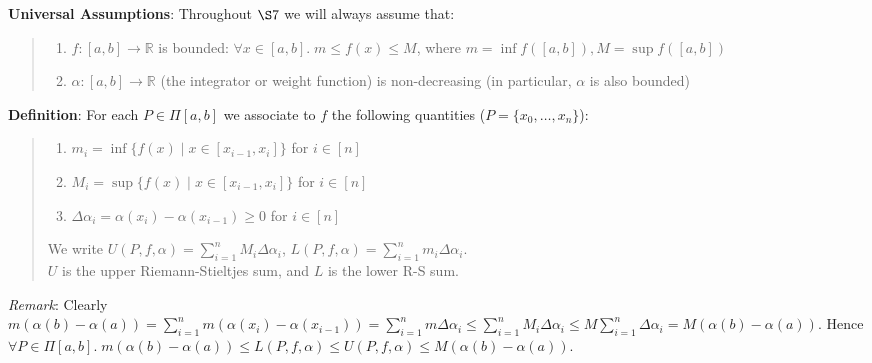 \documentclass[11pt]{article}
\begin{document}
\textbf{Universal Assumptions}: Throughout $\S 7$ we will always assume that:
\begin{quote}\vspace{-0.3cm}
	\begin{enumerate}
	\item $f : [a,b] \to \mathbb{R}$ is bounded: $\forall x \in [a,b].\; m \leq f(x) \leq M$, where $m = \inf f([a,b]), M = \sup f([a,b])$
	\item $\alpha : [a, b] \to \mathbb{R}$ (the integrator or weight function) is non-decreasing (in particular, $\alpha$ is also bounded)
	\end{enumerate}
\end{quote}

\textbf{Definition}: For each $P \in \Pi[a,b]$ we associate to $f$ the following quantities ($P = \{x_0, \ldots, x_n\}$):
\begin{quote}\vspace{-0.3cm}
	\begin{enumerate}
	\item $m_i = \inf \{f(x) \;|\; x \in [x_{i-1}, x_i]\}$ for $i \in [n]$
	\item $M_i = \sup \{f(x) \;|\; x \in [x_{i-1}, x_i]\}$ for $i \in [n]$
	\item $\Delta \alpha_i = \alpha(x_i) - \alpha(x_{i-1}) \geq 0$ for $i \in [n]$
	\end{enumerate}

	We write $U(P, f, \alpha) = \sum_{i=1}^n M_i \Delta \alpha_i$, $L(P, f, \alpha) = \sum_{i=1}^n m_i \Delta \alpha_i$.\\
$U$ is the upper Riemann-Stieltjes sum, and $L$ is the lower R-S sum.
\end{quote}

\emph{Remark}: Clearly $m(\alpha(b) - \alpha(a)) = \sum_{i=1}^n m(\alpha(x_i) - \alpha(x_{i-1})) = \sum_{i=1}^n m \Delta \alpha_i \leq \sum_{i=1}^n M_i \Delta \alpha_i \leq M \sum_{i=1}^n \Delta \alpha_i = M(\alpha(b) - \alpha(a))$. Hence $\forall P \in \Pi[a,b].\; m(\alpha(b) - \alpha(a)) \leq L(P, f, \alpha) \leq U(P, f, \alpha) \leq M(\alpha(b) - \alpha(a))$.\\
\end{document}
